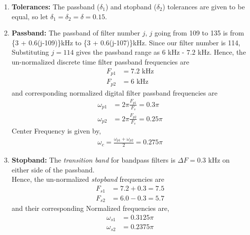 \documentclass[journal,12pt,twocolumn]{IEEEtran}
\begin{document}
\begin{enumerate}
\item {\textbf{Tolerances:}}  The passband ($\delta_1$) and stopband ($\delta_2$) tolerances are given to
be equal, so let $\delta_1 = \delta_2 = \delta = 0.15$.

\item {\textbf{Passband:}}  The passband of filter number $j$, $j$ going from 109 to 135 is from \{3 + 0.6(j-109)\}kHz
to \{3 + 0.6(j-107)\}kHz.  Since our filter number is 114, Substituting $j = 114$ gives the passband
range as $6$ kHz - $7.2$ kHz.  Hence, the un-normalized discrete time filter
passband frequencies are
\begin{align}
    F_{p1} &= 7.2 \text{ kHz}\\
    F_{p2} &= 6 \text{ kHz}
\end{align}
and corresponding normalized digital filter passband frequencies are
\begin{align}
    \omega_{p1} &= 2\pi\frac{F_{p1}}{F_s} =0.3\pi \\
    \omega_{p2} &= 2\pi\frac{F_{p2}}{F_s}  = 0.25 \pi
\end{align}
Center Frequency is given by,
\begin{align}
    \omega_c = \frac{\omega_{p1} + \omega_{p2}}{2} = 0.275\pi
\end{align}

\item {\textbf{Stopband:}}  The {\em transition band} for bandpass filters is $\Delta F = 0.3$ kHz on either side of the passband.\\
Hence, the un-normalized {\em stopband} frequencies are 
\begin{align}
    F_{s1} &= 7.2 + 0.3 = 7.5\\
    F_{s2} &= 6.0 - 0.3 = 5.7
\end{align}
and their corresponding Normalized frequencies are,
\begin{align}
    \omega_{s1} &= 0.3125 \pi\\
    \omega_{s2} &=  0.2375 \pi
\end{align}
\end{enumerate}
\end{document}
